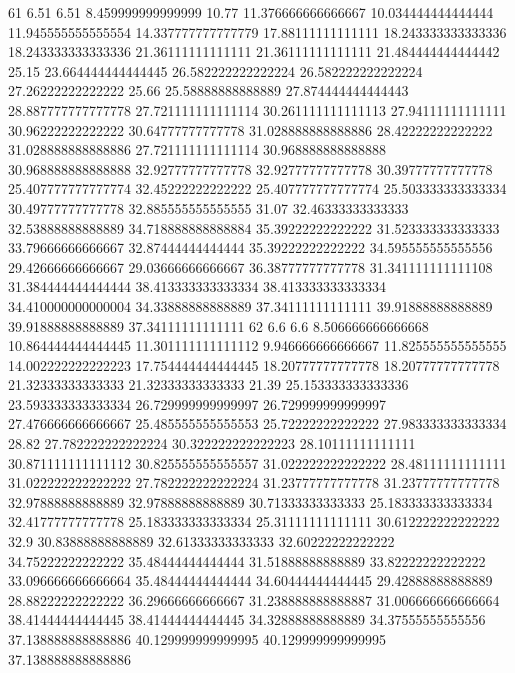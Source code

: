 61 6.51 6.51 8.459999999999999 10.77 11.376666666666667 10.034444444444444 11.945555555555554 14.337777777777779 17.88111111111111 18.243333333333336 18.243333333333336 21.36111111111111 21.36111111111111 21.484444444444442 25.15 23.664444444444445 26.582222222222224 26.582222222222224 27.26222222222222 25.66 25.58888888888889 27.874444444444443 28.887777777777778 27.721111111111114 30.261111111111113 27.94111111111111 30.96222222222222 30.64777777777778 31.028888888888886 28.42222222222222 31.028888888888886 27.721111111111114 30.968888888888888 30.968888888888888 32.92777777777778 32.92777777777778 30.39777777777778 25.407777777777774 32.45222222222222 25.407777777777774 25.503333333333334 30.49777777777778 32.885555555555555 31.07 32.46333333333333 32.53888888888889 34.718888888888884 35.39222222222222 31.523333333333333 33.79666666666667 32.87444444444444 35.39222222222222 34.595555555555556 29.42666666666667 29.03666666666667 36.38777777777778 31.341111111111108 31.384444444444444 38.413333333333334 38.413333333333334 34.410000000000004 34.33888888888889 37.34111111111111 39.91888888888889 39.91888888888889 37.34111111111111
62 6.6 6.6 8.506666666666668 10.864444444444445 11.301111111111112 9.946666666666667 11.825555555555555 14.002222222222223 17.754444444444445 18.20777777777778 18.20777777777778 21.32333333333333 21.32333333333333 21.39 25.153333333333336 23.593333333333334 26.729999999999997 26.729999999999997 27.476666666666667 25.485555555555553 25.72222222222222 27.983333333333334 28.82 27.782222222222224 30.322222222222223 28.10111111111111 30.871111111111112 30.825555555555557 31.022222222222222 28.48111111111111 31.022222222222222 27.782222222222224 31.23777777777778 31.23777777777778 32.97888888888889 32.97888888888889 30.71333333333333 25.183333333333334 32.41777777777778 25.183333333333334 25.31111111111111 30.612222222222222 32.9 30.83888888888889 32.61333333333333 32.60222222222222 34.75222222222222 35.48444444444444 31.51888888888889 33.82222222222222 33.096666666666664 35.48444444444444 34.60444444444445 29.42888888888889 28.88222222222222 36.29666666666667 31.238888888888887 31.006666666666664 38.41444444444445 38.41444444444445 34.32888888888889 34.37555555555556 37.138888888888886 40.129999999999995 40.129999999999995 37.138888888888886
